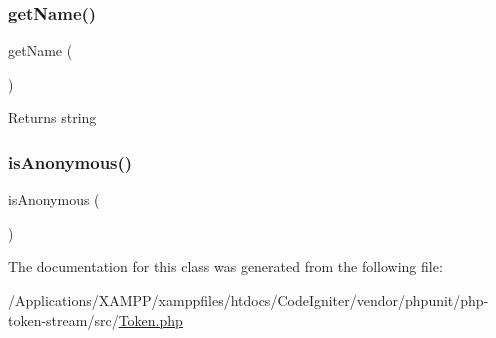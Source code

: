 \subsubsection{\texorpdfstring{get\+Name()}{getName()}}
{\footnotesize\ttfamily get\+Name (\begin{DoxyParamCaption}{ }\end{DoxyParamCaption})}

\begin{DoxyReturn}{Returns}
string 
\end{DoxyReturn}
\mbox{\label{class_p_h_p___token___c_l_a_s_s_a1e7b2580aa378d9676b1212e012a177f}} 
\subsubsection{\texorpdfstring{is\+Anonymous()}{isAnonymous()}}
{\footnotesize\ttfamily is\+Anonymous (\begin{DoxyParamCaption}{ }\end{DoxyParamCaption})}



The documentation for this class was generated from the following file\+:\begin{DoxyCompactItemize}
\item 
/\+Applications/\+X\+A\+M\+P\+P/xamppfiles/htdocs/\+Code\+Igniter/vendor/phpunit/php-\/token-\/stream/src/\mbox{\hyperlink{_token_8php}{Token.\+php}}\end{DoxyCompactItemize}
